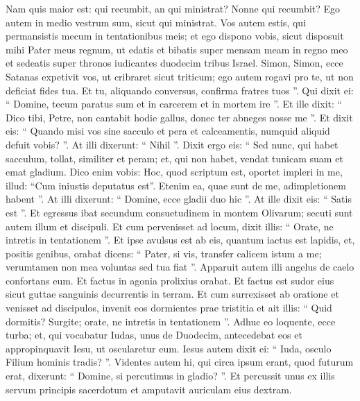 \begin{biblechapter}
\begin{biblechapter}
\begin{biblechapter}
\begin{biblechapter}
\begin{biblechapter}
\begin{biblechapter}
\begin{biblechapter}
\begin{biblechapter}
\begin{biblechapter}
\begin{biblechapter}
\begin{biblechapter}
\begin{biblechapter}
\begin{biblechapter}
\begin{biblechapter}
\begin{biblechapter}
\begin{biblechapter}
\begin{biblechapter}
\begin{biblechapter}
\begin{biblechapter}
\begin{biblechapter}
\begin{biblechapter}
\begin{biblechapter}
\verse Nam quis maior est: qui recumbit, an qui ministrat? Nonne qui recumbit? Ego autem in medio vestrum sum, sicut qui ministrat.
 \verse Vos autem estis, qui permansistis mecum in tentationibus meis; 
\verse et ego dispono vobis, sicut disposuit mihi Pater meus regnum, 
\verse ut edatis et bibatis super mensam meam in regno meo et sedeatis super thronos iudicantes duodecim tribus Israel.
 \verse Simon, Simon, ecce Satanas expetivit vos, ut cribraret sicut triticum; 
\verse ego autem rogavi pro te, ut non deficiat fides tua. Et tu, aliquando conversus, confirma fratres tuos ”. 
\verse Qui dixit ei: “ Domine, tecum paratus sum et in carcerem et in mortem ire ”. 
\verse Et ille dixit: “ Dico tibi, Petre, non cantabit hodie gallus, donec ter abneges nosse me ”.
 \verse Et dixit eis: “ Quando misi vos sine sacculo et pera et calceamentis, numquid aliquid defuit vobis? ”. At illi dixerunt: “ Nihil ”. 
\verse Dixit ergo eis: “ Sed nunc, qui habet sacculum, tollat, similiter et peram; et, qui non habet, vendat tunicam suam et emat gladium. 
\verse Dico enim vobis: Hoc, quod scriptum est, oportet impleri in me, illud: “Cum iniustis deputatus est”. Etenim ea, quae sunt de me, adimpletionem habent ”. 
\verse At illi dixerunt: “ Domine, ecce gladii duo hic ”. At ille dixit eis: “ Satis est ”.
 \verse Et egressus ibat secundum consuetudinem in montem Olivarum; secuti sunt autem illum et discipuli. 
\verse Et cum pervenisset ad locum, dixit illis: “ Orate, ne intretis in tentationem ”. 
\verse Et ipse avulsus est ab eis, quantum iactus est lapidis, et, positis genibus, orabat 
\verse dicens: “ Pater, si vis, transfer calicem istum a me; verumtamen non mea voluntas sed tua fiat ”. 
\verse Apparuit autem illi angelus de caelo confortans eum. Et factus in agonia prolixius orabat. 
\verse Et factus est sudor eius sicut guttae sanguinis decurrentis in terram. 
\verse Et cum surrexisset ab oratione et venisset ad discipulos, invenit eos dormientes prae tristitia 
\verse et ait illis: “ Quid dormitis? Surgite; orate, ne intretis in tentationem ”.
 \verse Adhuc eo loquente, ecce turba; et, qui vocabatur Iudas, unus de Duodecim, antecedebat eos et appropinquavit Iesu, ut oscularetur eum. 
\verse Iesus autem dixit ei: “ Iuda, osculo Filium hominis tradis? ”. 
\verse Videntes autem hi, qui circa ipsum erant, quod futurum erat, dixerunt: “ Domine, si percutimus in gladio? ”. 
\verse Et percussit unus ex illis servum principis sacerdotum et amputavit auriculam eius dextram. 

\end{biblechapter}
\end{biblechapter}
\end{biblechapter}
\end{biblechapter}
\end{biblechapter}
\end{biblechapter}
\end{biblechapter}
\end{biblechapter}
\end{biblechapter}
\end{biblechapter}
\end{biblechapter}
\end{biblechapter}
\end{biblechapter}
\end{biblechapter}
\end{biblechapter}
\end{biblechapter}
\end{biblechapter}
\end{biblechapter}
\end{biblechapter}
\end{biblechapter}
\end{biblechapter}
\end{biblechapter}
